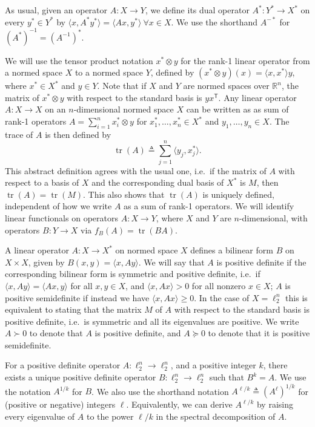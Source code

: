 \documentclass[11pt]{article}
\newcommand{\R}{{\mathbb{R}}}
\newcommand{\T}{\mathsf T}
\newcommand{\eqdef}{\triangleq}
\DeclareMathOperator{\tr}{tr}
\begin{document}
As usual, given an operator $A:X \to Y$, we define its dual operator
$A^*:Y^* \to X^*$ on every $y^* \in Y^*$ by $\langle x ,
A^*y^*\rangle = \langle Ax, y^*\rangle\ \forall x \in X$. We use the
shorthand $A^{-*}$ for $(A^{*})^{-1} = (A^{-1})^*$. 

We will use the tensor product notation $x^* \otimes y$ for the rank-1
linear operator from a normed space $X$ to a normed space $Y$, defined
by $(x^* \otimes y)(x) = \langle x, x^*\rangle y$, where $x^* \in X^*$
and $y \in Y$. Note that if $X$ and $Y$ are normed spaces over $\R^n$,
the matrix of $x^* \otimes y$ with respect to the standard basis is
$yx^\T$. Any linear operator $A:X \to X$ on an $n$-dimensional normed
space $X$ can be written as as sum of rank-1 operators $A = \sum_{i =
  1}^n{x^*_i \otimes y}$ for $x_1^*, \ldots, x_n^* \in X^*$ and $y_1,
\ldots, y_n \in X$. The trace of $A$ is then defined by
\[
\tr(A) \eqdef \sum_{j = 1}^n{\langle y_j, x^*_j \rangle}.
\]
This abstract definition agrees with the usual one, i.e.~if the matrix
of $A$ with respect to a basis of $X$ and the corresponding dual basis
of $X^*$ is $M$, then $\tr(A) = \tr(M)$. This also shows that $\tr(A)$
is uniquely defined, independent of how we write $A$ as a sum of
rank-1 operators. We will identify linear functionals on operators
$A:X \to Y$, where $X$ and $Y$ are $n$-dimensional, with operators
$B:Y \to X$ via $f_B(A) = \tr(BA)$.

A linear operator $A: X \to X^*$ on normed space $X$ defines a
bilinear form $B$ on $X \times X$, given by $B(x,y) = \langle x, Ay
\rangle$. We will say that $A$ is positive definite if the
corresponding bilinear form is symmetric and positive definite,
i.e.~if $\langle x, Ay \rangle = \langle Ax, y\rangle$ for all $x,y
\in X$, and $\langle x, Ax \rangle >0$ for all nonzero $x \in X$; $A$
is positive semidefinite if instead we have $\langle x, Ax \rangle \ge
0.$ In the case of $X = \ell_2^n$ this is equivalent to stating that
the matrix $M$ of $A$ with respect to the standard basis is positive
definite, i.e.~is symmetric and all its eigenvalues are positive. We
write $A \succ 0$ to denote that $A$ is positive definite, and $A
\succeq 0$ to denote that it is positive semidefinite.

For a positive definite operator $A:\ell_2^n \to \ell_2^n$, and a
positive integer $k$, there exists a unique positive definite operator
$B:\ell_2^n \to \ell_2^n$ such that $B^k = A$. We use the notation
$A^{1/k}$ for $B$. We also use the shorthand notation $A^{\ell/k} \eqdef
(A^\ell)^{1/k}$ for (positive or negative) integers
$\ell$. Equivalently, we can derive $A^{\ell/k}$ by raising every
eigenvalue of $A$ to the power $\ell/k$ in the spectral decomposition
of $A$.
\end{document}
